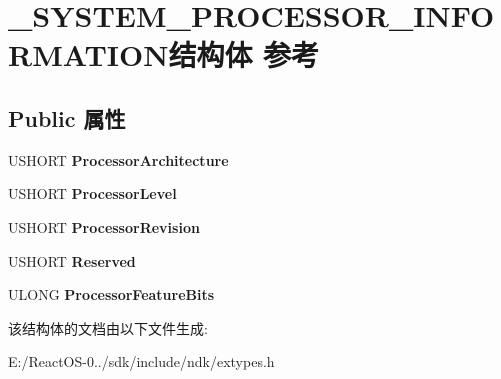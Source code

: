 \hypertarget{struct___s_y_s_t_e_m___p_r_o_c_e_s_s_o_r___i_n_f_o_r_m_a_t_i_o_n}{}\section{\+\_\+\+S\+Y\+S\+T\+E\+M\+\_\+\+P\+R\+O\+C\+E\+S\+S\+O\+R\+\_\+\+I\+N\+F\+O\+R\+M\+A\+T\+I\+O\+N结构体 参考}
\label{struct___s_y_s_t_e_m___p_r_o_c_e_s_s_o_r___i_n_f_o_r_m_a_t_i_o_n}
\subsection*{Public 属性}
\begin{DoxyCompactItemize}
\item 
\mbox{\label{struct___s_y_s_t_e_m___p_r_o_c_e_s_s_o_r___i_n_f_o_r_m_a_t_i_o_n_ab6e59fb9e2e202bccf2223912ff7e935}} 
U\+S\+H\+O\+RT {\bfseries Processor\+Architecture}
\item 
\mbox{\label{struct___s_y_s_t_e_m___p_r_o_c_e_s_s_o_r___i_n_f_o_r_m_a_t_i_o_n_a2aaf2261caf00868cf2bdc237ce81325}} 
U\+S\+H\+O\+RT {\bfseries Processor\+Level}
\item 
\mbox{\label{struct___s_y_s_t_e_m___p_r_o_c_e_s_s_o_r___i_n_f_o_r_m_a_t_i_o_n_a457da4406a431257929da0ffa9ba5f69}} 
U\+S\+H\+O\+RT {\bfseries Processor\+Revision}
\item 
\mbox{\label{struct___s_y_s_t_e_m___p_r_o_c_e_s_s_o_r___i_n_f_o_r_m_a_t_i_o_n_a2467783cd42fc694ee2df404c8f9a9b3}} 
U\+S\+H\+O\+RT {\bfseries Reserved}
\item 
\mbox{\label{struct___s_y_s_t_e_m___p_r_o_c_e_s_s_o_r___i_n_f_o_r_m_a_t_i_o_n_a728888ad61c909932ac957f652a8bf13}} 
U\+L\+O\+NG {\bfseries Processor\+Feature\+Bits}
\end{DoxyCompactItemize}


该结构体的文档由以下文件生成\+:\begin{DoxyCompactItemize}
\item 
E\+:/\+React\+O\+S-\/0../sdk/include/ndk/extypes.\+h\end{DoxyCompactItemize}
